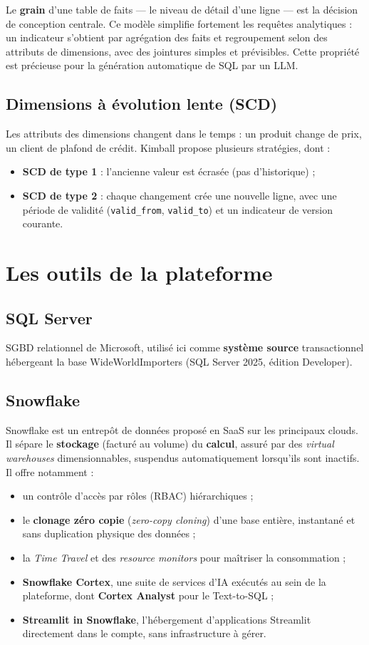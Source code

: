 Le \textbf{grain} d'une table de faits --- le niveau de détail d'une ligne --- est la décision de
conception centrale. Ce modèle simplifie fortement les requêtes analytiques : un indicateur s'obtient
par agrégation des faits et regroupement selon des attributs de dimensions, avec des jointures simples
et prévisibles. Cette propriété est précieuse pour la génération automatique de SQL par un LLM.

\subsection{Dimensions à évolution lente (SCD)}
Les attributs des dimensions changent dans le temps : un produit change de prix, un client de plafond de
crédit. Kimball propose plusieurs stratégies, dont :
\begin{itemize}
  \item \textbf{SCD de type 1} : l'ancienne valeur est écrasée (pas d'historique) ;
  \item \textbf{SCD de type 2} : chaque changement crée une nouvelle ligne, avec une période de
        validité (\texttt{valid\_from}, \texttt{valid\_to}) et un indicateur de version courante.
\end{itemize}

\section{Les outils de la plateforme}

\subsection{SQL Server}
SGBD relationnel de Microsoft, utilisé ici comme \textbf{système source} transactionnel hébergeant la
base WideWorldImporters (SQL Server 2025, édition Developer).

\subsection{Snowflake}
Snowflake est un entrepôt de données proposé en SaaS sur les principaux clouds. Il sépare le
\textbf{stockage} (facturé au volume) du \textbf{calcul}, assuré par des \emph{virtual warehouses}
dimensionnables, suspendus automatiquement lorsqu'ils sont inactifs. Il offre notamment :
\begin{itemize}
  \item un contrôle d'accès par rôles (RBAC) hiérarchiques ;
  \item le \textbf{clonage zéro copie} (\emph{zero-copy cloning}) d'une base entière, instantané et sans
        duplication physique des données ;
  \item la \emph{Time Travel} et des \emph{resource monitors} pour maîtriser la consommation ;
  \item \textbf{Snowflake Cortex}, une suite de services d'IA exécutés au sein de la plateforme, dont
        \textbf{Cortex Analyst} pour le Text-to-SQL ;
  \item \textbf{Streamlit in Snowflake}, l'hébergement d'applications Streamlit directement dans le
        compte, sans infrastructure à gérer.
\end{itemize}

